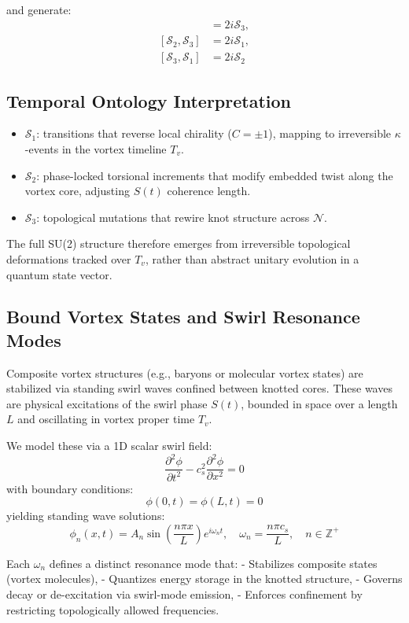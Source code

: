 \documentclass[12pt]{article}
\begin{document}
and generate:
\begin{align}
[\mathcal{S}_1, \mathcal{S}_2] &= 2i \mathcal{S}_3, \\
[\mathcal{S}_2, \mathcal{S}_3] &= 2i \mathcal{S}_1, \\
[\mathcal{S}_3, \mathcal{S}_1] &= 2i \mathcal{S}_2
\end{align}

\subsection*{Temporal Ontology Interpretation}

\begin{itemize}
  \item \( \mathcal{S}_1 \): transitions that reverse local chirality (\( C = \pm 1 \)), mapping to irreversible $\kappa$-events in the vortex timeline \( T_v \).
  \item \( \mathcal{S}_2 \): phase-locked torsional increments that modify embedded twist along the vortex core, adjusting $S(t)$ coherence length.
  \item \( \mathcal{S}_3 \): topological mutations that rewire knot structure across $\mathcal{N}$.
\end{itemize}

The full SU(2) structure therefore emerges from irreversible topological deformations tracked over \( T_v \), rather than abstract unitary evolution in a quantum state vector.

\subsection*{Bound Vortex States and Swirl Resonance Modes}

Composite vortex structures (e.g., baryons or molecular vortex states) are stabilized via standing swirl waves confined between knotted cores. These waves are physical excitations of the swirl phase \( S(t) \), bounded in space over a length \( L \) and oscillating in vortex proper time \( T_v \).

We model these via a 1D scalar swirl field:
\[
\frac{\partial^2 \phi}{\partial t^2} - c_s^2 \frac{\partial^2 \phi}{\partial x^2} = 0
\]
with boundary conditions:
\[
\phi(0,t) = \phi(L,t) = 0
\]
yielding standing wave solutions:
\[
\phi_n(x,t) = A_n \sin\left( \frac{n\pi x}{L} \right) e^{i \omega_n t}, \quad
\omega_n = \frac{n\pi c_s}{L}, \quad n \in \mathbb{Z}^+
\]

Each \( \omega_n \) defines a distinct resonance mode that:
- Stabilizes composite states (vortex molecules),
- Quantizes energy storage in the knotted structure,
- Governs decay or de-excitation via swirl-mode emission,
- Enforces confinement by restricting topologically allowed frequencies.
\end{document}
